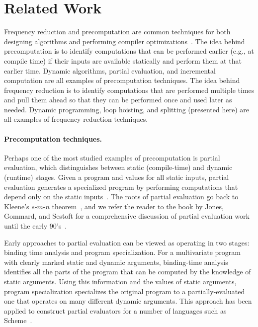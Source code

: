 
\section{Related Work}
\label{sec:related}

Frequency reduction and precomputation are common techniques for both
designing algorithms and performing compiler
optimizations~\cite{JS86-staging}.
%
The idea behind precomputation is to identify computations that can be
performed earlier (e.g., at compile time) if their inputs are
available statically and perform them at that earlier time. Dynamic
algorithms, partial evaluation, and incremental computation are all
examples of precomputation techniques.
%
The idea behind frequency reduction is to identify computations that
are performed multiple times and pull them ahead so that they can be
performed once and used later as needed.  Dynamic programming, loop
hoisting, and splitting (presented here) are all examples of frequency
reduction techniques.

\paragraph{Precomputation techniques.}
Perhaps one of the most studied examples of precomputation is partial
evaluation, which distinguishes between static (compile-time) and
dynamic (runtime) stages. Given a program and values for all static
inputs, partial evaluation generates a specialized program by
performing computations that depend only on the static
inputs~\cite{jones96}.  The roots of partial evaluation go back to
Kleene's $s$-$m$-$n$ theorem~\cite{Kleene52},
and we refer the reader to the book by Jones, Gommard, and Sestoft for
a comprehensive discussion of partial evaluation work until the early
90's~\cite{JGS93}.

Early approaches to partial evaluation can be viewed as operating in
two stages: binding time analysis and program specialization.  For a
multivariate program with clearly marked static and dynamic arguments,
binding-time analysis identifies all the parts of the program that can
be computed by the knowledge of static arguments. Using this
information and the values of static arguments, program specialization
specializes the original program to a partially-evaluated one that
operates on many different dynamic arguments.  This approach has been
applied to construct partial evaluators for a number of languages such
as Scheme~\cite{OB91-Similix,Consel88-Schism}.

